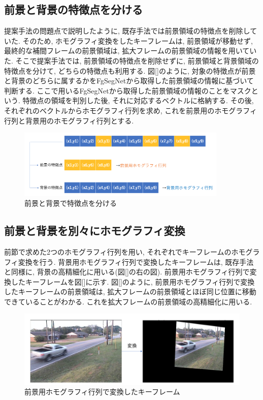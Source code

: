 \documentclass[a4paper,12pt]{jsreport}
\begin{document}
\subsection{前景と背景の特徴点を分ける}
提案手法の問題点で説明したように, 既存手法では前景領域の特徴点を削除していた. そのため, ホモグラフィ変換をしたキーフレームは, 前景領域が移動せず, 最終的な補間フレームの前景領域は, 拡大フレームの前景領域の情報を用いていた. そこで提案手法では, 前景領域の特徴点を削除せずに, 前景領域と背景領域の特徴点を分けて, どちらの特徴点も利用する. 図[]のように, 対象の特徴点が前景と背景のどちらに属するかをFgSegNetから取得した前景領域の情報に基づいて判断する. ここで用いるFgSegNetから取得した前景領域の情報のことをマスクという. 特徴点の領域を判別した後, それに対応するベクトルに格納する. その後, それぞれのベクトルからホモグラフィ行列を求め, これを前景用のホモグラフィ行列と背景用のホモグラフィ行列とする.

\begin{figure}[h]
  \begin{center}
    \includegraphics[width=10cm]{./teian_1.png}
    \caption{前景と背景で特徴点を分ける}
  \end{center}
\end{figure}

\subsection{前景と背景を別々にホモグラフィ変換}
前節で求めた2つのホモグラフィ行列を用い, それぞれでキーフレームのホモグラフィ変換を行う. 背景用ホモグラフィ行列で変換したキーフレームは, 既存手法と同様に, 背景の高精細化に用いる(図[]の右の図). 前景用ホモグラフィ行列で変換したキーフレームを図[]に示す. 図[]のように, 前景用ホモグラフィ行列で変換したキーフレームの前景領域は, 拡大フレームの前景領域とほぼ同じ位置に移動できていることがわかる. これを拡大フレームの前景領域の高精細化に用いる.

\begin{figure}[h]
  \begin{center}
    \includegraphics[width=13cm]{./teian_2.png}
    \caption{前景用ホモグラフィ行列で変換したキーフレーム}
  \end{center}
\end{figure}
\end{document}
